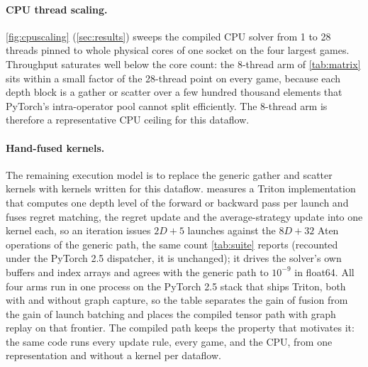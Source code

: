 \paragraph{CPU thread scaling.}
\cref{fig:cpuscaling} (\cref{sec:results}) sweeps the compiled CPU solver from 1 to 28 threads pinned to
whole physical cores of one socket on the four largest games. Throughput saturates
well below the core count: the 8-thread arm of \cref{tab:matrix} sits within a
small factor of the 28-thread point on every game, because each depth block is a
gather or scatter over a few hundred thousand elements that PyTorch's intra-operator
pool cannot split efficiently. The 8-thread arm is therefore a representative CPU
ceiling for this dataflow.


\paragraph{Hand-fused kernels.}
The remaining execution model is to replace the generic gather and scatter kernels
with kernels written for this dataflow.  measures a Triton
implementation that computes one depth level of the forward or backward pass per
launch and fuses regret matching, the regret update and the average-strategy update
into one kernel each, so an iteration issues $2D + 5$ launches against the
$8D + 32$ Aten operations of the generic path, the same count \cref{tab:suite} reports
(recounted under the PyTorch 2.5 dispatcher, it is unchanged); it drives the solver's own buffers and
index arrays and agrees with the generic path to $10^{-9}$ in float64. All four arms
run in one process on the PyTorch 2.5 stack that ships Triton, both with and without
graph capture, so the table separates the gain of fusion from the gain of launch
batching and places the compiled tensor path with graph replay on that frontier. The
compiled path keeps the property that motivates it: the same code runs every update
rule, every game, and the CPU, from one representation and without a kernel per
dataflow.




